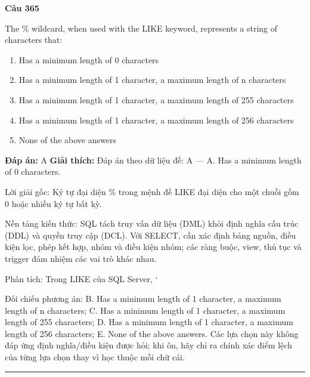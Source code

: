 \documentclass[11pt,a4paper]{article}
\newenvironment{question}[1]{%
  \par\vspace{1em}\noindent\textbf{\large Câu #1}\par\vspace{0.4em}
}{%
  \par\vspace{1em}\hrule\vspace{0.6em}
}
\newenvironment{choices}{%
  \begin{enumerate}[label=\textbf{\Alph*.},leftmargin=2.2em,itemsep=2pt,topsep=3pt]
}{%
  \end{enumerate}
}
\newcommand{\choice}{\item}
\begin{document}
\begin{question}{365}
The \% wildcard, when used with the LIKE keyword, represents a string of characters that:
\begin{choices}
\choice Has a minimum length of 0 characters
\choice Has a minimum length of 1 character, a maximum length of n characters
\choice Has a minimum length of 1 character, a maximum length of 255 characters
\choice Has a minimum length of 1 character, a maximum length of 256 characters
\choice None of the above answers
\end{choices}
\textbf{Đáp án:} A
\textbf{Giải thích:} Đáp án theo dữ liệu đề: A — A. Has a minimum length of 0 characters.

Lời giải gốc: Ký tự đại diện \% trong mệnh đề LIKE đại diện cho một chuỗi gồm 0 hoặc nhiều ký tự bất kỳ.

Nền tảng kiến thức: SQL tách truy vấn dữ liệu (DML) khỏi định nghĩa cấu trúc (DDL) và quyền truy cập (DCL). Với SELECT, cần xác định bảng nguồn, điều kiện lọc, phép kết hợp, nhóm và điều kiện nhóm; các ràng buộc, view, thủ tục và trigger đảm nhiệm các vai trò khác nhau.

Phân tích: Trong LIKE của SQL Server, `%

Đối chiếu phương án: B. Has a minimum length of 1 character, a maximum length of n characters; C. Has a minimum length of 1 character, a maximum length of 255 characters; D. Has a minimum length of 1 character, a maximum length of 256 characters; E. None of the above answers. Các lựa chọn này không đáp ứng định nghĩa/điều kiện được hỏi; khi ôn, hãy chỉ ra chính xác điểm lệch của từng lựa chọn thay vì học thuộc mỗi chữ cái.
\end{question}
\end{document}

